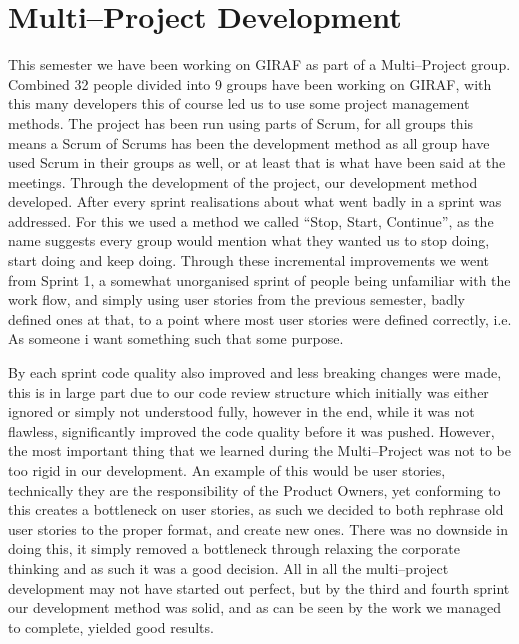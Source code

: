 \section{Multi--Project Development}
This semester we have been working on GIRAF as part of a Multi--Project group.
Combined 32 people divided into 9 groups have been working on GIRAF, with this many developers this of course led us to use some project management methods.
The project has been run using parts of Scrum, for all groups this means a Scrum of Scrums has been the development method as all group have used Scrum in their groups as well, or at least that is what have been said at the meetings.
Through the development of the project, our development method developed.
After every sprint realisations about what went badly in a sprint was addressed.
For this we used a method we called ``Stop, Start, Continue'', as the name suggests every group would mention what they wanted us to stop doing, start doing and keep doing.
Through these incremental improvements we went from Sprint 1, a somewhat unorganised sprint of people being unfamiliar with the work flow, and simply using user stories from the previous semester, badly defined ones at that, to a point where most user stories were defined correctly, i.e. As someone i want something such that some purpose.

By each sprint code quality also improved and less breaking changes were made, this is in large part due to our code review structure which initially was either ignored or simply not understood fully, however in the end, while it was not flawless, significantly improved the code quality before it was pushed.
However, the most important thing that we learned during the Multi--Project was not to be too rigid in our development.
An example of this would be user stories, technically they are the responsibility of the Product Owners, yet conforming to this creates a bottleneck on user stories, as such we decided to both rephrase old user stories to the proper format, and create new ones.
There was no downside in doing this, it simply removed a bottleneck through relaxing the corporate thinking and as such it was a good decision.
All in all the multi--project development may not have started out perfect, but by the third and fourth sprint our development method was solid, and as can be seen by the work we managed to complete, yielded good results.

